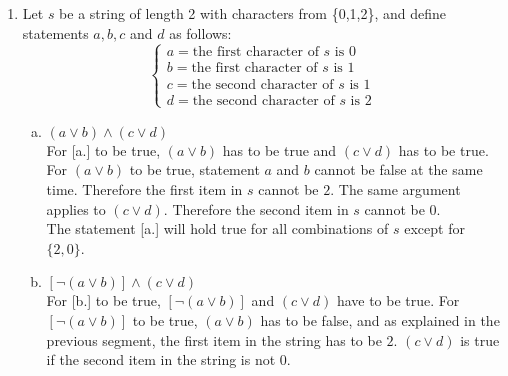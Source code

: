\documentclass[12pt]{article}
\newcommand{\T}[0]{\top}
\begin{document}
\begin{enumerate}
\begin{proof}
\begin{align*}
                \equiv & [r \wedge \T ] \rightarrow r & \text{Negation Law}\\
                \equiv & r \rightarrow r & \text{Identity Law}\\
                \equiv & \neg r \vee r & \text{Theorem *}\\
                \equiv &  r \vee \neg r & \text{Commutativity}\\
                \equiv & \T & \text{Negation Law}
            \end{align*}
            \[
            \therefore [(p \rightarrow q) \wedge (p \rightarrow \neg q)] \rightarrow \neg p \equiv \T
            \]
        \end{proof}
    \newpage
    \item Let $s$ be a string of length 2 with characters from \{0,1,2\}, and define statements $a,b,c$ and $d$ as follows:\\
        \[
            \begin{cases}
                a = \text{the first character of $s$ is 0}\\
                b = \text{the first character of $s$ is 1}\\
                c = \text{the second character of $s$ is 1}\\
                d = \text{the second character of $s$ is 2}
            \end{cases}
        \]
        \begin{enumerate}[a.]
            \item $(a\vee b)\wedge (c\vee d)$\\
                For [a.] to be true, $(a\vee b)$ has to be true and $(c\vee d)$ has to be true. For $(a\vee b)$ to be true, statement $a$ and $b$ cannot be false at the same time. Therefore the first item in $s$ cannot be $2$. The same argument applies to $(c\vee d)$. Therefore the second item in $s$ cannot be 0.\\
                The statement [a.] will hold true for all combinations of $s$ except for $\{2,0\}$.
            \\
            \item $\left[\neg (a\vee b)\right] \wedge (c \vee d)$\\
                For [b.] to be true, $\left[\neg (a\vee b)\right]$ and $(c \vee d)$ have to be true. For $\left[\neg (a\vee b)\right]$ to be true, $(a\vee b)$ has to be false, and as explained in the previous segment, the first item in the string has to be $2$. $(c\vee d)$ is true if the second item in the string is not $0$.\\

\end{enumerate}
\end{enumerate}
\end{document}
